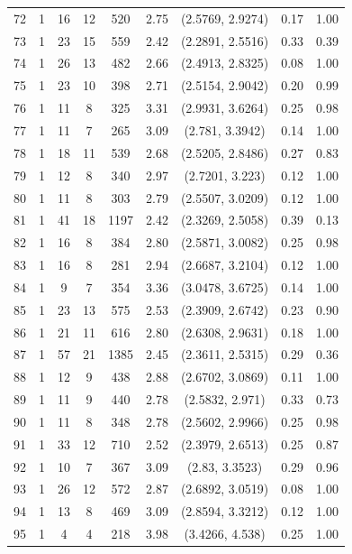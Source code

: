 \documentclass{article}
\begin{document}
\begin{appendices}
\begin{longtable}{ccccccccc}
72 &   1 &  16 &  12 & 520 & 2.75 & (2.5769, 2.9274) & 0.17 & 1.00 \\ 
73 &   1 &  23 &  15 & 559 & 2.42 & (2.2891, 2.5516) & 0.33 & 0.39 \\ 
74 &   1 &  26 &  13 & 482 & 2.66 & (2.4913, 2.8325) & 0.08 & 1.00 \\ 
75 &   1 &  23 &  10 & 398 & 2.71 & (2.5154, 2.9042) & 0.20 & 0.99 \\ 
76 &   1 &  11 &   8 & 325 & 3.31 & (2.9931, 3.6264) & 0.25 & 0.98 \\ 
77 &   1 &  11 &   7 & 265 & 3.09 & (2.781, 3.3942) & 0.14 & 1.00 \\ 
78 &   1 &  18 &  11 & 539 & 2.68 & (2.5205, 2.8486) & 0.27 & 0.83 \\ 
79 &   1 &  12 &   8 & 340 & 2.97 & (2.7201, 3.223) & 0.12 & 1.00 \\ 
80 &   1 &  11 &   8 & 303 & 2.79 & (2.5507, 3.0209) & 0.12 & 1.00 \\ 
81 &   1 &  41 &  18 & 1197 & 2.42 & (2.3269, 2.5058) & 0.39 & 0.13 \\ 
82 &   1 &  16 &   8 & 384 & 2.80 & (2.5871, 3.0082) & 0.25 & 0.98 \\ 
83 &   1 &  16 &   8 & 281 & 2.94 & (2.6687, 3.2104) & 0.12 & 1.00 \\ 
84 &   1 &   9 &   7 & 354 & 3.36 & (3.0478, 3.6725) & 0.14 & 1.00 \\ 
85 &   1 &  23 &  13 & 575 & 2.53 & (2.3909, 2.6742) & 0.23 & 0.90 \\ 
86 &   1 &  21 &  11 & 616 & 2.80 & (2.6308, 2.9631) & 0.18 & 1.00 \\ 
87 &   1 &  57 &  21 & 1385 & 2.45 & (2.3611, 2.5315) & 0.29 & 0.36 \\ 
88 &   1 &  12 &   9 & 438 & 2.88 & (2.6702, 3.0869) & 0.11 & 1.00 \\ 
89 &   1 &  11 &   9 & 440 & 2.78 & (2.5832, 2.971) & 0.33 & 0.73 \\ 
90 &   1 &  11 &   8 & 348 & 2.78 & (2.5602, 2.9966) & 0.25 & 0.98 \\ 
91 &   1 &  33 &  12 & 710 & 2.52 & (2.3979, 2.6513) & 0.25 & 0.87 \\ 
92 &   1 &  10 &   7 & 367 & 3.09 & (2.83, 3.3523) & 0.29 & 0.96 \\ 
93 &   1 &  26 &  12 & 572 & 2.87 & (2.6892, 3.0519) & 0.08 & 1.00 \\ 
94 &   1 &  13 &   8 & 469 & 3.09 & (2.8594, 3.3212) & 0.12 & 1.00 \\ 
95 &   1 &   4 &   4 & 218 & 3.98 & (3.4266, 4.538) & 0.25 & 1.00 \\ 

\end{longtable}
\end{appendices}
\end{document}

